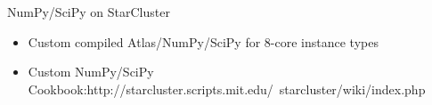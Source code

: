 \begin{frame}{NumPy/SciPy on StarCluster}
    \begin{itemize}
       \item Custom compiled Atlas/NumPy/SciPy for 8-core instance types
       \item Custom NumPy/SciPy Cookbook:\linebreak http://starcluster.scripts.mit.edu/~starcluster/wiki/index.php
    \end{itemize}
\end{frame}
